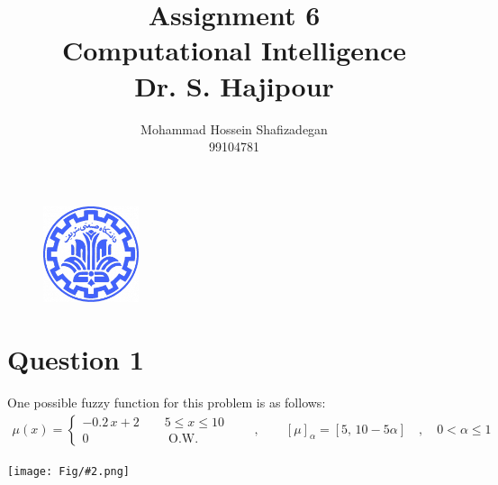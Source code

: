 \documentclass[]{article}
\author{
	Mohammad Hossein Shafizadegan\\
	99104781
}
\title{
	Assignment 6 \\
	Computational Intelligence  \\
	Dr. S. Hajipour
}
\newcommand{\pict}[2]{\begin{center}
		\texttt{[image: Fig/\#2.png]}
\end{center}}
\begin{document}
	\begin{figure}
		\includegraphics[width=0.25\textwidth]{Fig/Sharif.png}
		\centering
	\end{figure}
	\maketitle
	\tableofcontents
	\newpage
	\section{Question 1}
	One possible fuzzy function for this problem is as follows:
	\begin{align*}
		\mu(x) = \begin{cases}
			-0.2 \, x +2 \qquad 5 \le x \le 10 \\
			0  \qquad\qquad\qquad \text{ O.W.}
		\end{cases} \qquad , \qquad [\mu]_\alpha = [5, \, 10 - 5\alpha] \quad , \quad 0<\alpha\le1
	\end{align*}
	\pict{0.5}{F1}
	
\end{document}
